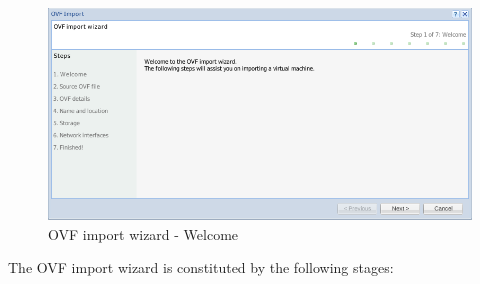 \begin{figure}[H]
	\begin{center}
	\includegraphics[scale=0.5]{screenshots/ovf_import.png}
	\caption{OVF import wizard - Welcome}
	\label{fig:ovf_import_wiz}
	\end{center}
\end{figure}
The OVF import wizard is constituted by the following stages:

